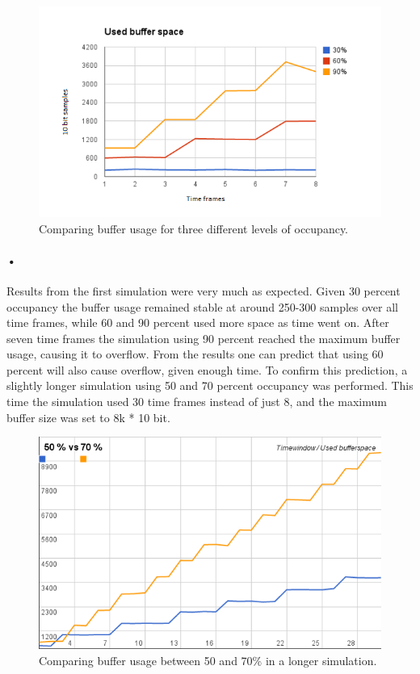 \documentclass[a4paper, 12pt]{report}
\begin{document}
\begin{figure}[h!]
	\centering
		\includegraphics[width=1.0\textwidth]{images/results-flat30-60-80-8tf.png}
		\caption{Comparing buffer usage for three different levels of occupancy.}
		\label{fig:results-30-60-90}
\end{figure}

\paragraph{•} %
Results from the first simulation were very much as expected.
Given 30 percent occupancy the buffer usage remained stable at around 250-300 samples over all time frames, while 60 and 90 percent used more space as time went on.
After seven time frames the simulation using 90 percent reached the maximum buffer usage, causing it to overflow.
From the results one can predict that using 60 percent will also cause overflow, given enough time.
To confirm this prediction, a slightly longer simulation using 50 and 70 percent occupancy was performed.
This time the simulation used 30 time frames instead of just 8, and the maximum buffer size was set to 8k * 10 bit.

\begin{figure}[h!]
	\centering
		\includegraphics[width=1.0\textwidth]{images/50v70.png}
		\caption{Comparing buffer usage between 50 and 70\% in a longer simulation.}
		\label{fig:results-50-70}
\end{figure}
\end{document}
